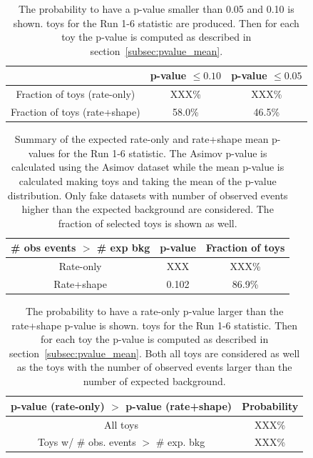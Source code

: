 %





\begin{table}
\centering
\begin{tabular}{| c | c | c |}
\hline
		                                          	& p-value $\leq 0.10$    		& p-value $\leq 0.05$ 		\\
\hline
Fraction of toys	(rate-only)			& XXX\%					& XXX\%				\\
Fraction of toys	(rate+shape) 		& 58.0\%					& 46.5\%				\\
\hline
\end{tabular}
\caption{
The probability to have a p-value smaller than 0.05 and 0.10 is shown.
\NumToysLarge toys for
the Run 1-6 statistic
are produced.
Then for each toy the p-value is computed as described in section~\ref{subsec:pvalue_mean}.
}
\label{tab:pvalue_mean_0p05_lowpot}
\end{table}

\begin{table}
\centering
\begin{tabular}{| c | c | c |}
\hline
\# obs events $>$ \# exp bkg		& p-value    	 & Fraction of toys    	\\
\hline
Rate-only                          			&   XXX	    	& XXX\%             	\\
Rate+shape                          		&   0.102   	& 86.9\%                 	\\
\hline
\end{tabular}
\caption{
Summary of the expected rate-only and rate+shape mean p-values for 
the Run 1-6 statistic.
The Asimov p-value is calculated using the Asimov dataset while the 
mean p-value is calculated making \NumToysLarge toys and taking the mean 
of the p-value distribution.
Only fake datasets with number of observed events higher than the
expected background are considered.
The fraction of selected toys is shown as well. 
}
\label{tab:pvalue_mean_bkg_lowpot}
\end{table}



\begin{table}
\centering
\begin{tabular}{| c | c |}
\hline
p-value (rate-only) $>$ p-value (rate+shape)		& Probability          	\\
\hline
All toys									& XXX\%		 							\\
Toys w/ \# obs. events $>$ \# exp. bkg 			& XXX\%									\\
\hline
\end{tabular}
\caption{
The probability to have a rate-only p-value larger than the rate+shape p-value is shown.
\NumToysLarge toys for 
the Run 1-6 statistic.
Then for each toy the p-value is computed as described in section~\ref{subsec:pvalue_mean}.
Both all toys are considered as well as the toys with the number of observed events larger
than the number of expected background.
}
\label{tab:pvalue_mean_rate_large_shape_lowpot}
\end{table}


